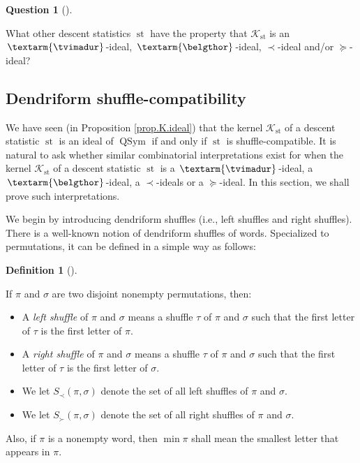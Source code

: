 \documentclass[numbers=enddot,12pt,final,onecolumn,notitlepage]{scrartcl}%
\theoremstyle{definition}
\newtheorem{defi}[theo]{Definition}
\newenvironment{definition}[1][]
{\begin{defi}[#1]\begin{leftbar}}
{\end{leftbar}\end{defi}}
\newtheorem{quest}[theo]{Question}
\newenvironment{question}[1][]
{\begin{quest}[#1]\begin{leftbar}}
{\end{leftbar}\end{quest}}
\newenvironment{question}[1][Question]{\noindent\textbf{#1.} }{\ \rule{0.5em}{0.5em}}
\newcommand{\tvi}{\left. \textarm{\tvimadur} \right.}
\newcommand{\bel}{\left. \textarm{\belgthor} \right.}
\begin{document}
\begin{question}
What other descent statistics $\operatorname*{st}$ have the property that
$\mathcal{K}_{\operatorname*{st}}$ is an $\tvi$-ideal, $\bel$-ideal, $\left.
\prec\right.  $-ideal and/or $\left.  \succeq\right.  $-ideal?
\end{question}

\subsection{Dendriform shuffle-compatibility}

We have seen (in Proposition \ref{prop.K.ideal}) that the kernel
$\mathcal{K}_{\operatorname*{st}}$ of a descent statistic $\operatorname*{st}$
is an ideal of $\operatorname*{QSym}$ if and only if $\operatorname*{st}$ is
shuffle-compatible. It is natural to ask whether similar combinatorial
interpretations exist for when the kernel $\mathcal{K}_{\operatorname*{st}}$
of a descent statistic $\operatorname*{st}$ is a $\tvi$-ideal, a $\bel$-ideal,
a $\left.  \prec\right.  $-ideals or a $\left.  \succeq\right.  $-ideal. In
this section, we shall prove such interpretations.

We begin by introducing dendriform shuffles (i.e., left shuffles and right
shuffles). There is a well-known notion of dendriform shuffles of words.
Specialized to permutations, it can be defined in a simple way as follows:

\begin{definition}
If $\pi$ and $\sigma$ are two disjoint nonempty permutations, then:

\begin{itemize}
\item A \textit{left shuffle} of $\pi$ and $\sigma$ means a shuffle $\tau$ of
$\pi$ and $\sigma$ such that the first letter of $\tau$ is the first letter of
$\pi$.

\item A \textit{right shuffle} of $\pi$ and $\sigma$ means a shuffle $\tau$ of
$\pi$ and $\sigma$ such that the first letter of $\tau$ is the first letter of
$\sigma$.

\item We let $S_{\prec}\left(  \pi,\sigma\right)  $ denote the set of all left
shuffles of $\pi$ and $\sigma$.

\item We let $S_{\succ}\left(  \pi,\sigma\right)  $ denote the set of all
right shuffles of $\pi$ and $\sigma$.
\end{itemize}

Also, if $\pi$ is a nonempty word, then $\min\pi$ shall mean the smallest
letter that appears in $\pi$.
\end{definition}
\end{document}
